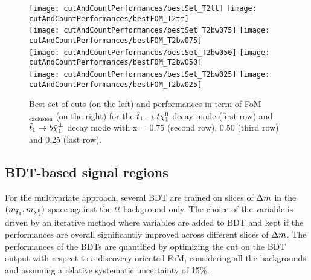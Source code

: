             \begin{figure}[h!]
                \centering
                \texttt{[image: cutAndCountPerformances/bestSet\_T2tt]}
                \texttt{[image: cutAndCountPerformances/bestFOM\_T2tt]}\\
                \texttt{[image: cutAndCountPerformances/bestSet\_T2bw075]}
                \texttt{[image: cutAndCountPerformances/bestFOM\_T2bw075]}\\
                \texttt{[image: cutAndCountPerformances/bestSet\_T2bw050]}
                \texttt{[image: cutAndCountPerformances/bestFOM\_T2bw050]}\\
                \texttt{[image: cutAndCountPerformances/bestSet\_T2bw025]}
                \texttt{[image: cutAndCountPerformances/bestFOM\_T2bw025]}
                \caption{Best set of cuts (on the left) and performances in term of 
                FoM$_\text{exclusion}$ (on the right) for the $\tilde{t}_1 \rightarrow t 
                \tilde{\chi}_1^0$ decay mode (first row) and $\tilde{t}_1 \rightarrow b \tilde{\chi}_1^\pm$ 
                decay mode with x = 0.75 (second row), 0.50 (third row) and 0.25 (last row). 
                }                                                     
                \label{fig:cutAndCountPerformances}
            \end{figure}

        \subsection{BDT-based signal regions}
        
        For the multivariate approach, several BDT are trained on slices of $\Delta m$ in the $(m_{\tilde{t}_1},m_{\tilde{\chi}_1^0})$
        space against the $t\bar{t}$ background only. The choice of the variable is driven by an iterative method where variables 
        are added to BDT and kept if the performances are overall significantly improved across different slices of $\Delta m$. The 
        performances of the BDTs are quantified by optimizing the cut on the BDT output with respect to a discovery-oriented 
        FoM, considering all the backgrounds and assuming a relative systematic uncertainty of 15\%.

